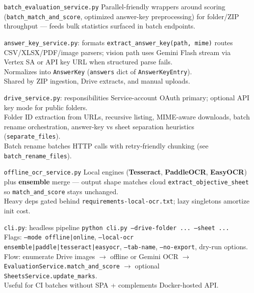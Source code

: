 \documentclass[aspectratio=169]{beamer}
\begin{document}
\begin{frame}{\texttt{batch\_evaluation\_service.py}}
  \small
  Parallel-friendly wrappers around scoring (\texttt{batch\_match\_and\_score}, optimized answer-key preprocessing) for folder/ZIP throughput --- feeds bulk statistics surfaced in batch endpoints.
\end{frame}

\begin{frame}{\texttt{answer\_key\_service.py}: formats}
  \small
  \texttt{extract\_answer\_key(path, mime)} routes CSV/XLSX/PDF/image parsers; vision path uses Gemini Flash stream via Vertex SA or API key URL when structured parse fails.\\
  Normalizes into \texttt{AnswerKey} (\texttt{answers} dict of \texttt{AnswerKeyEntry}).\\
  Shared by ZIP ingestion, Drive extracts, and manual uploads.
\end{frame}

\begin{frame}{\texttt{drive\_service.py}: responsibilities}
  \small
  Service-account OAuth primary; optional API key mode for public folders.\\
  Folder ID extraction from URLs, recursive listing, MIME-aware downloads, batch rename orchestration, answer-key vs sheet separation heuristics (\texttt{separate\_files}).\\
  Batch rename batches HTTP calls with retry-friendly chunking (see \texttt{batch\_rename\_files}).
\end{frame}

\begin{frame}{\texttt{offline\_ocr\_service.py}}
  \small
  Local engines (\textbf{Tesseract}, \textbf{PaddleOCR}, \textbf{EasyOCR}) plus \textbf{ensemble} merge --- output shape matches cloud \texttt{extract\_objective\_sheet} so \texttt{match\_and\_score} stays unchanged.\\
  Heavy deps gated behind \texttt{requirements-local-ocr.txt}; lazy singletons amortize init cost.
\end{frame}

\begin{frame}{\texttt{cli.py}: headless pipeline}
  \tiny
  \texttt{python cli.py --drive-folder ... --sheet ...}\\
  Flags: \texttt{--mode offline|online}, \texttt{--local-ocr ensemble|paddle|tesseract|easyocr}, \texttt{--tab-name}, \texttt{--no-export}, dry-run options.\\
  Flow: enumerate Drive images $\rightarrow$ offline or Gemini OCR $\rightarrow$ \texttt{EvaluationService.match\_and\_score} $\rightarrow$ optional \texttt{SheetsService.update\_marks}.\\
  Useful for CI batches without SPA + complements Docker-hosted API.
\end{frame}
\end{document}
